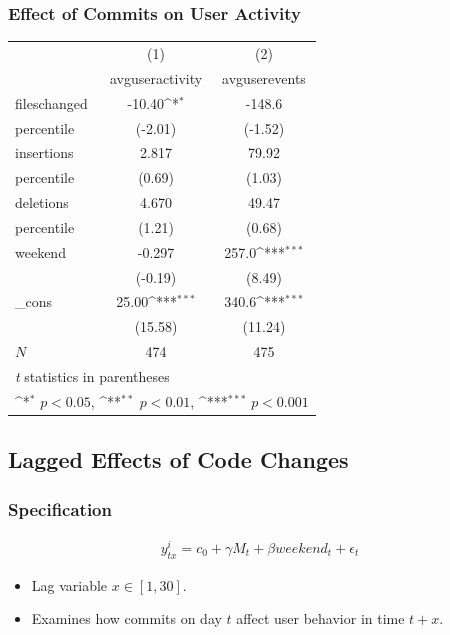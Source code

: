 \documentclass[xcolor=pdftex,dvipsnames,table]{beamer}
\begin{document}
\frame
{
    \frametitle{Effect of Commits on User Activity}
    \begin{table}[h!]
    \scriptsize
    \centering
    {
        \def\sym#1{\ifmmode^{#1}\else\(^{#1}\)\fi}
        \begin{tabular}{l*{2}{c}}
        \hline\hline
            &\multicolumn{1}{c}{(1)}&\multicolumn{1}{c}{(2)}\\
            &\multicolumn{1}{c}{avguseractivity}&\multicolumn{1}{c}{avguserevents}\\
            \hline
            fileschanged&     -10.40\sym{*}         &    -148.6  \\
 percentile           &     (-2.01)         &     (-1.52)   \\
            [1em]
            insertions&      2.817  &     79.92 \\
percentile
    &      (0.69)         &      (1.03)         \\
        [1em]
        deletions&      4.670        &    49.47    \\
        percentile&      (1.21)         &      (0.68)   \\
        [1em]
        weekend     &    -0.297&    257.0\sym{***}\\
        &    (-0.19)         &     (8.49)      \\
        [1em]
        \_cons      &     25.00\sym{***}&    340.6\sym{***}\\
        &     (15.58)         &     (11.24)      \\
        \hline
        \(N\)       &         474         &         475     \\
        \hline\hline
        \multicolumn{3}{l}{\textit{t} statistics in parentheses}\\
        \multicolumn{3}{l}{\sym{*} \(p<0.05\), \sym{**} \(p<0.01\), \sym{***} \(p<0.001\)}\\
        \end{tabular}
    }
    \end{table}
}

\subsection{Lagged Effects of Code Changes}

\frame{\tableofcontents[currentsubsection]}

\frame
{
    \frametitle{Specification}
    \begin{eqnarray}
    y^i_{tx} = c_0 + \gamma M_{t} + \beta weekend_{t} + \epsilon_t
    \end{eqnarray}

    \begin{itemize}
        \item Lag variable $x \in [1,30]$. 
        \item Examines how commits on day $t$ affect user behavior in time $t + x$. 
    \end{itemize}

}
\end{document}
